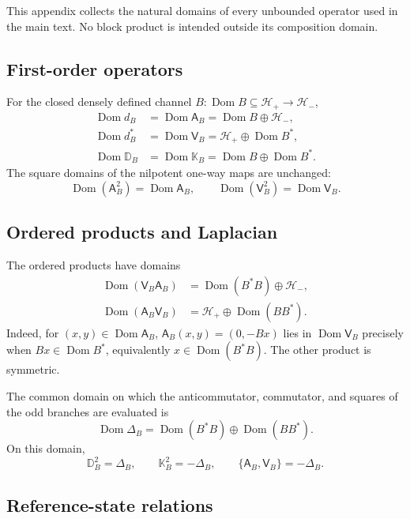 \documentclass[11pt,reqno]{scrartcl}
\newcommand{\scrHp}{\mathscr H_{+}}
\newcommand{\scrHm}{\mathscr H_{-}}
\newcommand{\Aop}{\mathsf A}
\newcommand{\Vop}{\mathsf V}
\newcommand{\DB}{\mathbb D}
\newcommand{\KB}{\mathbb K}
\newcommand{\DeltaB}{\Delta}
\DeclareMathOperator{\Dom}{Dom}
\theoremstyle{plain}
\theoremstyle{definition}
\theoremstyle{remark}
\begin{document}
This appendix collects the natural domains of every unbounded operator used
in the main text. No block product is intended outside its composition
domain.

\subsection{First-order operators}

For the closed densely defined channel
\(B:\Dom B\subseteq\scrHp\to\scrHm\),
\begin{align}
  \Dom d_B
  &=\Dom\Aop_B
  =\Dom B\oplus\scrHm,\\
  \Dom d_B^*
  &=\Dom\Vop_B
  =\scrHp\oplus\Dom B^*,\\
  \Dom\DB_B
  &=\Dom\KB_B
  =\Dom B\oplus\Dom B^*.
\end{align}
The square domains of the nilpotent one-way maps are unchanged:
\begin{equation}
  \Dom(\Aop_B^2)=\Dom\Aop_B,
  \qquad
  \Dom(\Vop_B^2)=\Dom\Vop_B.
\end{equation}

\subsection{Ordered products and Laplacian}

The ordered products have domains
\begin{align}
  \Dom(\Vop_B\Aop_B)
  &=\Dom(B^*B)\oplus\scrHm,\\
  \Dom(\Aop_B\Vop_B)
  &=\scrHp\oplus\Dom(BB^*).
\end{align}
Indeed, for \((x,y)\in\Dom\Aop_B\),
\(\Aop_B(x,y)=(0,-Bx)\) lies in \(\Dom\Vop_B\) precisely when
\(Bx\in\Dom B^*\), equivalently \(x\in\Dom(B^*B)\). The other product is
symmetric.

The common domain on which the anticommutator, commutator, and squares of the
odd branches are evaluated is
\begin{equation}
  \Dom\DeltaB_B
  =\Dom(B^*B)\oplus\Dom(BB^*).
\end{equation}
On this domain,
\begin{equation}
  \DB_B^2=\DeltaB_B,
  \qquad
  \KB_B^2=-\DeltaB_B,
  \qquad
  \{\Aop_B,\Vop_B\}=-\DeltaB_B.
\end{equation}

\subsection{Reference-state relations}
\end{document}
